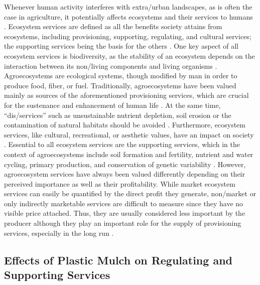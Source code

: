 Whenever human activity interferes with extra\-/urban landscapes, as is often the case in agriculture, it potentially affects ecosystems and their services to humans \citep{FoleyGlobal2005}. Ecosystem services are defined as all the benefits society attains from ecosystems, including provisioning, supporting, regulating, and cultural services; the supporting services being the basis for the others \citep{MillenniumEcosystemAssessmentEcosystems2005}. One key aspect of all ecosystem services is biodiversity, as the stability of an ecosystem depends on the interaction between its non\-/living components and living organisms \citep{Haines-YoungLinks2010}. Agroecosystems are ecological systems, though modified by man in order to produce food, fiber, or fuel.
Traditionally, agroecosystems have been valued mainly as sources of the aforementioned provisioning services, which are crucial for the sustenance and enhancement of human life \citep{PowerEcosystem2010}. At the same time, ``dis\-/services'' such as unsustainable nutrient depletion, soil erosion or the contamination of natural habitats should be avoided \citep{ZhangEcosystem2007}. Furthermore, ecosystem services, like cultural, recreational, or aesthetic values, have an impact on society \citep{UlrichHuman1986}. Essential to all ecosystem services are the supporting services, which in the context of agroecosystems include soil formation and fertility, nutrient and water cycling, primary production, and conservation of genetic variability \citep{MillenniumEcosystemAssessmentEcosystems2005}. However, agroecosystem services have always been valued differently depending on their perceived importance as well as their profitability. While market ecosystem services can easily be quantified by the direct profit they generate, non\-/market or only indirectly marketable services are difficult to measure since they have no visible price attached. Thus, they are usually considered less important by the producer although they play an important role for the supply of provisioning services, especially in the long run \citep{SwintonEcosystem2007}.

\subsection{Effects of Plastic Mulch on Regulating and Supporting Services}

